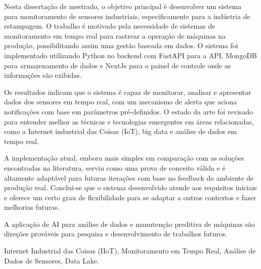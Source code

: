 
Nesta dissertação de mestrado, o objetivo principal é desenvolver um sistema para monitoramento de sensores industriais, especificamente para a indústria de estampagem. O trabalho é motivado pela necessidade de sistemas de monitoramento em tempo real para rastrear a operação de máquinas na produção, possibilitando assim uma gestão baseada em dados. O sistema foi implementado utilizando Python no backend com FastAPI para a API, MongoDB para armazenamento de dados e NextJs para o painel de controle onde as informações são exibidas.

Os resultados indicam que o sistema é capaz de monitorar, analisar e apresentar dados dos sensores em tempo real, com um mecanismo de alerta que aciona notificações com base em parâmetros pré-definidos. O estado da arte foi revisado para entender melhor as técnicas e tecnologias emergentes em áreas relacionadas, como a Internet industrial das Coisas (IoT), big data e análise de dados em tempo real.

A implementação atual, embora mais simples em comparação com as soluções encontradas na literatura, serviu como uma prova de conceito válida e é altamente adaptável para futuras iterações com base no feedback do ambiente de produção real. Conclui-se que o sistema desenvolvido atende aos requisitos iniciais e oferece um certo grau de flexibilidade para se adaptar a outros contextos e fazer melhorias futuras.

A aplicação de \gls{AI} para análise de dados e manutenção preditiva de máquinas são direções prováveis para pesquisa e desenvolvimento de trabalhos futuros.

\mbox{}\linebreak
{} Internet Industrial das Coisas (IIoT), Monitoramento em Tempo Real, Análise de Dados de Sensores, Data Lake.


